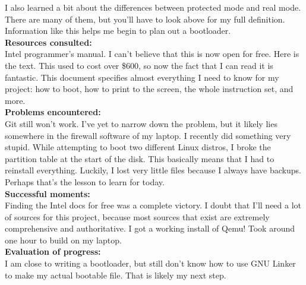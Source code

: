 \documentclass[11pt]{article}
\begin{document}
I also learned a bit about the differences between protected mode and real mode. There are many of them, but you'll have to look above for my full definition. Information like this helps me begin to plan out a bootloader.\\
\textbf{Resources consulted:}\\
Intel programmer's manual. I can't believe that this is now open for free. Here is the text. This used to cost over \$600, so now the fact that I can read it is fantastic. This document specifies almost everything I need to know for my project: how to boot, how to print to the screen, the whole instruction set, and more.\\
\textbf{Problems encountered:}\\
Git still won't work. I've yet to narrow down the problem, but it likely lies somewhere in the firewall software of my laptop.
I recently did something very stupid. While attempting to boot two different Linux distros, I broke the partition table at the start of the disk. This basically means that I had to reinstall everything. Luckily, I lost very little files because I always have backups. Perhaps that's the lesson to learn for today. \\
\textbf{Successful moments:}\\
Finding the Intel docs for free was a complete victory. I doubt that I'll need a lot of sources for this project, because most sources that exist are extremely comprehensive and authoritative. I got a working install of Qemu! Took around one hour to build on my laptop.\\
\textbf{Evaluation of progress:}\\
I am close to writing a bootloader, but still don't know how to use GNU Linker to make my actual bootable file. That is likely my next step.\\
\end{document}
